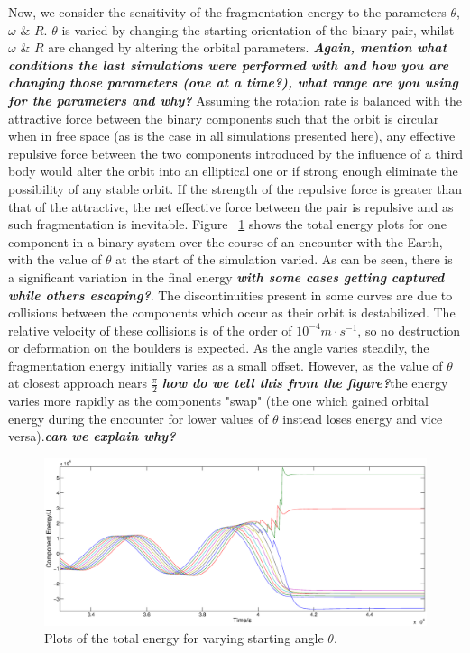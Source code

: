 \documentclass[letterpaper, preprint, paper,11pt]{AAS}	%
\begin{document}
Now, we consider the sensitivity of the fragmentation energy to the parameters $\theta$, $\omega$ \& $R$. $\theta$ is varied by changing the starting orientation of the binary pair, whilst $\omega$ \& $R$ are changed by altering the orbital parameters. \textbf{\emph{Again, mention what conditions the last simulations were performed with and how you are changing those parameters (one at a time?), what range are you using for the parameters and why?}} Assuming the rotation rate is balanced with the attractive force between the binary components such that the orbit is circular when in free space (as is the case in all simulations presented here), any effective repulsive force between the two components introduced by the influence of a third body would alter the orbit into an elliptical one or if strong enough eliminate the possibility of any stable orbit. If the strength of the repulsive force is greater than that of the attractive, the net effective force between the pair is repulsive and as such fragmentation is inevitable. Figure ~\ref{fig:phase} shows the total energy plots for one component in a binary system over the course of an encounter with the Earth, with the value of $\theta$ at the start of the simulation varied. As can be seen, there is a significant variation in the final energy \textbf{\emph{with some cases getting captured while others escaping?}}. The discontinuities present in some curves are due to collisions between the components which occur as their orbit is destabilized. The relative velocity of these collisions is of the order of $10^{-4}m\cdot s^{-1}$,  so no destruction or deformation on the boulders is expected. As the angle varies steadily, the fragmentation energy initially varies as a small offset. However, as the value of $\theta$ at closest approach nears $\frac{\pi}{2}$ \textbf{\emph{how do we tell this from the figure?}}the energy varies more rapidly as the components "swap" (the one which gained orbital energy during the encounter for lower values of $\theta$ instead loses energy and vice versa).\textbf{\emph{can we explain why?}}
 \begin{figure}[H]
\centering
\centerline{\includegraphics[width=1.2\textwidth]{phasing_2.eps}} 
\caption{Plots of the total energy for varying starting angle $\theta$.} 
\label{fig:phase}
\end{figure} 
\end{document}
